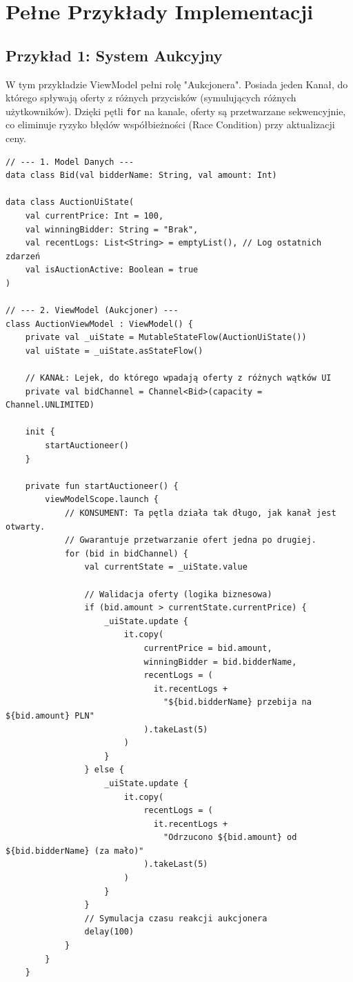 \section{Pełne Przykłady Implementacji}

\subsection{Przykład 1: System Aukcyjny}

W tym przykładzie ViewModel pełni rolę "Aukcjonera". Posiada jeden Kanał, do którego spływają oferty z różnych przycisków (symulujących różnych użytkowników). Dzięki pętli \texttt{for} na kanale, oferty są przetwarzane sekwencyjnie, co eliminuje ryzyko błędów współbieżności (Race Condition) przy aktualizacji ceny.

\begin{verbatim}
// --- 1. Model Danych ---
data class Bid(val bidderName: String, val amount: Int)

data class AuctionUiState(
    val currentPrice: Int = 100,
    val winningBidder: String = "Brak",
    val recentLogs: List<String> = emptyList(), // Log ostatnich zdarzeń
    val isAuctionActive: Boolean = true
)

// --- 2. ViewModel (Aukcjoner) ---
class AuctionViewModel : ViewModel() {
    private val _uiState = MutableStateFlow(AuctionUiState())
    val uiState = _uiState.asStateFlow()

    // KANAŁ: Lejek, do którego wpadają oferty z różnych wątków UI
    private val bidChannel = Channel<Bid>(capacity = Channel.UNLIMITED)

    init {
        startAuctioneer()
    }

    private fun startAuctioneer() {
        viewModelScope.launch {
            // KONSUMENT: Ta pętla działa tak długo, jak kanał jest otwarty.
            // Gwarantuje przetwarzanie ofert jedna po drugiej.
            for (bid in bidChannel) {
                val currentState = _uiState.value
                
                // Walidacja oferty (logika biznesowa)
                if (bid.amount > currentState.currentPrice) {
                    _uiState.update {
                        it.copy(
                            currentPrice = bid.amount,
                            winningBidder = bid.bidderName,
                            recentLogs = (
                              it.recentLogs + 
                                "${bid.bidderName} przebija na ${bid.amount} PLN"
                            ).takeLast(5)
                        )
                    }
                } else {
                    _uiState.update {
                        it.copy(
                            recentLogs = (
                              it.recentLogs + 
                                "Odrzucono ${bid.amount} od ${bid.bidderName} (za mało)"
                            ).takeLast(5)
                        )
                    }
                }
                // Symulacja czasu reakcji aukcjonera
                delay(100) 
            }
        }
    }


\end{verbatim}
